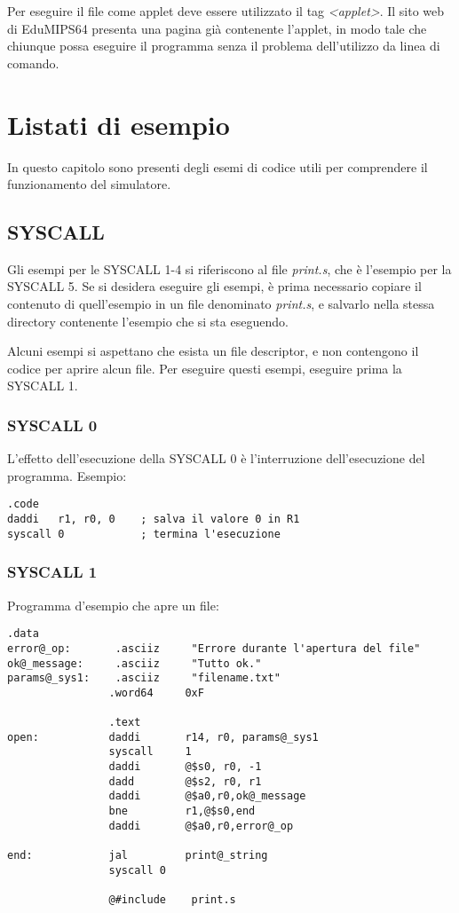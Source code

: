 \documentclass[letterpaper,10pt,english]{sphinxmanual}
\begin{document}
Per eseguire il file come applet deve essere utilizzato il tag
\emph{\textless{}applet\textgreater{}}. Il sito web di EduMIPS64 presenta una pagina già contenente
l'applet, in modo tale che chiunque possa eseguire il programma senza il
problema dell'utilizzo da linea di comando.


\chapter{Listati di esempio}
\label{examples::doc}\label{examples:listati-di-esempio}
In questo capitolo sono presenti degli esemi di codice utili per comprendere
il funzionamento del simulatore.


\section{SYSCALL}
\label{examples:syscall}
Gli esempi per le SYSCALL 1-4 si riferiscono al file \emph{print.s}, che è
l'esempio per la SYSCALL 5. Se si desidera eseguire gli esempi, è prima
necessario copiare il contenuto di quell'esempio in un file denominato
\emph{print.s}, e salvarlo nella stessa directory contenente l'esempio che si sta
eseguendo.

Alcuni esempi si aspettano che esista un file descriptor, e non contengono il
codice per aprire alcun file. Per eseguire questi esempi, eseguire prima la
SYSCALL 1.


\subsection{SYSCALL 0}
\label{examples:syscall-0}
L'effetto dell'esecuzione della SYSCALL 0 è l'interruzione dell'esecuzione del programma.
Esempio:

\begin{Verbatim}[commandchars=@\[\]]
.code
daddi   r1, r0, 0    ; salva il valore 0 in R1
syscall 0            ; termina l'esecuzione
\end{Verbatim}


\subsection{SYSCALL 1}
\label{examples:syscall-1}
Programma d'esempio che apre un file:

\begin{Verbatim}[commandchars=@\[\]]
                .data
error@_op:       .asciiz     "Errore durante l'apertura del file"
ok@_message:     .asciiz     "Tutto ok."
params@_sys1:    .asciiz     "filename.txt"
                .word64     0xF

                .text
open:           daddi       r14, r0, params@_sys1
                syscall     1
                daddi       @$s0, r0, -1
                dadd        @$s2, r0, r1
                daddi       @$a0,r0,ok@_message
                bne         r1,@$s0,end
                daddi       @$a0,r0,error@_op

end:            jal         print@_string
                syscall 0

                @#include    print.s
\end{Verbatim}
\end{document}
